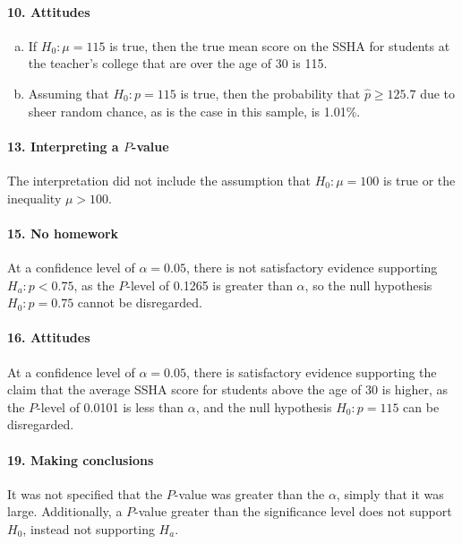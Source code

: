		\paragraph{10. Attitudes}
			\begin{enumerate}[a.]
				\item
					If $H_0:\mu = 115$ is true, then the true mean score on the SSHA for students at the teacher's college that are over the age of 30 is 115.
				\item
					Assuming that $H_0:p = 115$ is true, then the probability that $\hat{p} \ge 125.7$ due to sheer random chance, as is the case in this sample, is 1.01\%.
			\end{enumerate}
		\paragraph{13. Interpreting a $P$-value}
			The interpretation did not include the assumption that $H_0:\mu = 100$ is true or the inequality $\mu > 100$.
		\paragraph{15. No homework}
			At a confidence level of $\alpha = 0.05$, there is not satisfactory evidence supporting $H_a:p < 0.75$, as the $P$-level of 0.1265 is greater than $\alpha$, so the null hypothesis $H_0:p = 0.75$ cannot be disregarded.
		\paragraph{16. Attitudes}
			At a confidence level of $\alpha = 0.05$, there is satisfactory evidence supporting the claim that the average SSHA score for students above the age of 30 is higher, as the $P$-level of 0.0101 is less than $\alpha$, and the null hypothesis $H_0: p = 115$ can be disregarded.
		\paragraph{19. Making conclusions}
			It was not specified that the $P$-value was greater than the $\alpha$, simply that it was large. Additionally, a $P$-value greater than the significance level does not support $H_0$, instead not supporting $H_a$.
